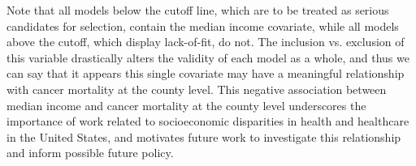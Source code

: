 		Note that all models below the cutoff line, which are to be treated as serious candidates for selection, contain the median income covariate, while all models
		above the cutoff, which display lack-of-fit, do not. The inclusion vs. exclusion of this variable drastically alters the validity of each model as a whole, and
		thus we can say that it appears this single covariate may have a meaningful relationship with cancer mortality at the county level. This negative association between
		median income and cancer mortality at the county level underscores the importance of work related to socioeconomic disparities in health and healthcare in the United States,
		and motivates future work to investigate this relationship and inform possible future policy.

